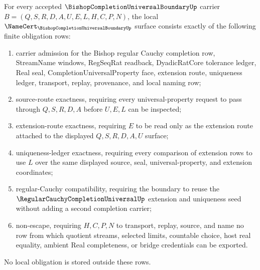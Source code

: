 \begin{theorem}
\label{thm:bishop-completion-universal-namecert-obligations}
For every accepted $\BishopCompletionUniversalBoundaryUp$ carrier $B=(Q,S,R,D,A,U,E,L,H,C,P,N)$, the local $\NameCert_{\BishopCompletionUniversalBoundaryUp}$ surface consists exactly of the following finite obligation rows:
\begin{enumerate}
\item carrier admission for the Bishop regular Cauchy completion row, StreamName windows, RegSeqRat readback, DyadicRatCore tolerance ledger, Real seal, CompletionUniversalProperty face, extension route, uniqueness ledger, transport, replay, provenance, and local naming row;
\item source-route exactness, requiring every universal-property request to pass through $Q,S,R,D,A$ before $U,E,L$ can be inspected;
\item extension-route exactness, requiring $E$ to be read only as the extension route attached to the displayed $Q,S,R,D,A,U$ surface;
\item uniqueness-ledger exactness, requiring every comparison of extension rows to use $L$ over the same displayed source, seal, universal-property, and extension coordinates;
\item regular-Cauchy compatibility, requiring the boundary to reuse the $\RegularCauchyCompletionUniversalUp$ extension and uniqueness seed without adding a second completion carrier;
\item non-escape, requiring $H,C,P,N$ to transport, replay, source, and name no row from which quotient streams, selected limits, countable choice, host real equality, ambient Real completeness, or bridge credentials can be exported.
\end{enumerate}
No local obligation is stored outside these rows.
\end{theorem}
